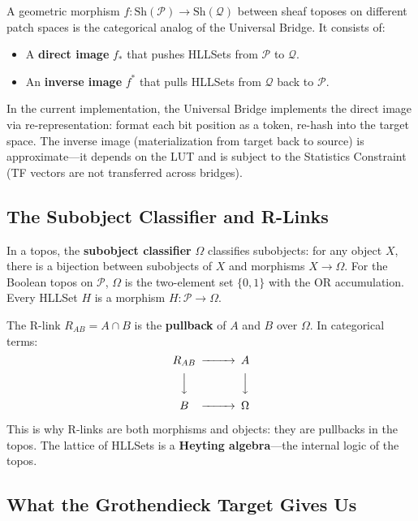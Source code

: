 \documentclass[11pt,a4paper]{article}
\theoremstyle{remark}
\begin{document}
A geometric morphism $f: \text{Sh}(\mathcal{P}) \to \text{Sh}(\mathcal{Q})$ between
sheaf toposes on different patch spaces is the categorical analog of the Universal
Bridge. It consists of:
\begin{itemize}[leftmargin=*,nosep]
  \item A \textbf{direct image} $f_*$ that pushes HLLSets from $\mathcal{P}$ to
    $\mathcal{Q}$.
  \item An \textbf{inverse image} $f^*$ that pulls HLLSets from $\mathcal{Q}$ back to
    $\mathcal{P}$.
\end{itemize}

In the current implementation, the Universal Bridge implements the direct image via
re-representation: format each bit position as a token, re-hash into the target space.
The inverse image (materialization from target back to source) is approximate---it
depends on the LUT and is subject to the Statistics Constraint (TF vectors are not
transferred across bridges).

\subsection{The Subobject Classifier and R-Links}

In a topos, the \textbf{subobject classifier} $\Omega$ classifies subobjects: for any
object $X$, there is a bijection between subobjects of $X$ and morphisms $X \to \Omega$.
For the Boolean topos on $\mathcal{P}$, $\Omega$ is the two-element set $\{0, 1\}$
with the OR accumulation. Every HLLSet $H$ is a morphism $H: \mathcal{P} \to \Omega$.

The R-link $R_{AB} = A \cap B$ is the \textbf{pullback} of $A$ and $B$ over $\Omega$.
In categorical terms:
\begin{equation}
  \begin{CD}
    R_{AB} @>>> A \\
    @VVV @VVV \\
    B @>>> \Omega
  \end{CD}
\end{equation}

This is why R-links are both morphisms and objects: they are pullbacks in the topos.
The lattice of HLLSets is a \textbf{Heyting algebra}---the internal logic of the topos.

\subsection{What the Grothendieck Target Gives Us}
\end{document}
